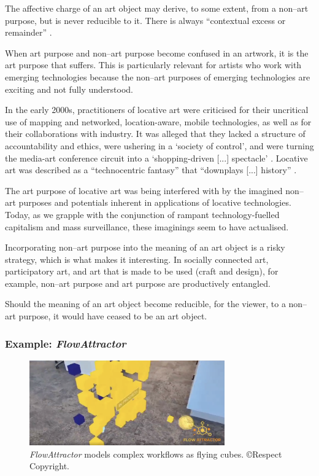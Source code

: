 \documentclass[letter:wpaper]{article}
\begin{document}
    The affective charge of an art object may derive, to some extent, from a non–art purpose, but is never reducible to it. There is always ``contextual excess or remainder'' \citep[p.252]{MassumiPrblsFrThVrtl2002}.
    
    When art purpose and non–art purpose become confused in an artwork, it is the art purpose that suffers. This is particularly relevant for artists who work with emerging technologies because the non–art purposes of emerging technologies are exciting and not fully understood.
    
	In the early 2000s, practitioners of locative art were criticised for their uncritical use of mapping and networked, location-aware, mobile technologies, as well as for their collaborations with industry. It was alleged that they lacked a structure of accountability and ethics, were ushering in a `society of control', and were turning the media-art conference circuit into a `shopping-driven [...] spectacle' \citep[p.358]{beyondLocativeMedia2006}. Locative art was described as a ``technocentric fantasy'' that ``downplays [...] history'' \citep[para. 2]{questioningTheFrame2004}.
    
    The art purpose of locative art was being interfered with by the imagined non–art purposes and potentials inherent in applications of locative technologies. Today, as we grapple with the conjunction of rampant technology-fuelled capitalism and mass surveillance, these imaginings seem to have actualised. 

    Incorporating non–art purpose into the meaning of an art object is a risky strategy, which is what makes it interesting. In socially connected art, participatory art, and art that is made to be used (craft and design), for example, non–art purpose and art purpose are productively entangled. 
    
    Should the meaning of an art object become reducible, for the viewer, to a non–art purpose, it would have ceased to be an art object.

    \subsubsection{Example: \emph{FlowAttractor}}

    \begin{figure}[h]
        \includegraphics[width=3.31in]{flow-attractor.png}
        \caption{\emph{FlowAttractor} models complex workflows as flying cubes. \copyright Respect Copyright.}
        \label{fig:flow-attractor}
    \end{figure}
\end{document}
